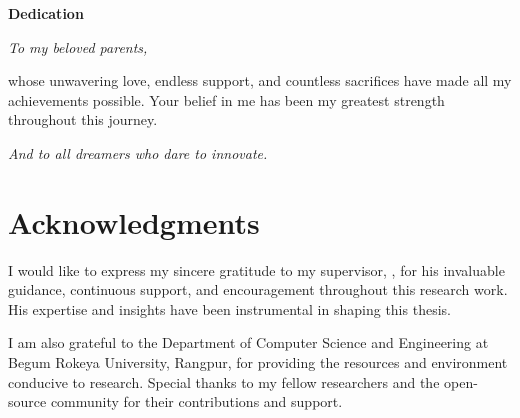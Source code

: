 \newpage
\thispagestyle{empty}
\vspace*{3cm}

\begin{center}
    {\Large \textbf{Dedication}}

    \vspace{2cm}

    \begin{minipage}{0.8\textwidth}
    \large
    \textit{To my beloved parents,}

    \vspace{0.5cm}

    whose unwavering love, endless support, and countless sacrifices have made all my achievements possible. Your belief in me has been my greatest strength throughout this journey.

    \vspace{0.5cm}

    \textit{And to all dreamers who dare to innovate.}
    \end{minipage}
\end{center}
\clearpage

\chapter*{Acknowledgments}
I would like to express my sincere gratitude to my supervisor, \thesupervisor, for his invaluable guidance, continuous support, and encouragement throughout this research work. His expertise and insights have been instrumental in shaping this thesis.

I am also grateful to the Department of Computer Science and Engineering at Begum Rokeya University, Rangpur, for providing the resources and environment conducive to research. Special thanks to my fellow researchers and the open-source community for their contributions and support.

\clearpage